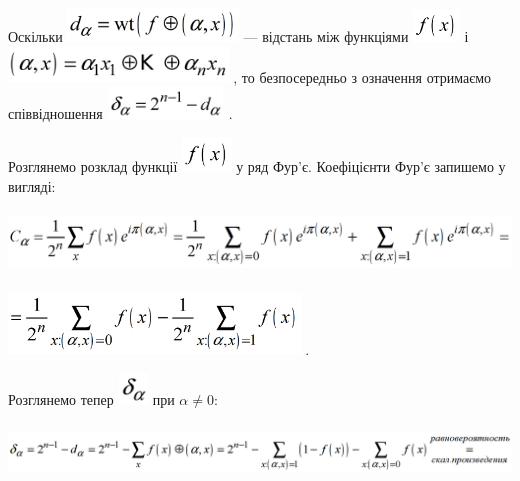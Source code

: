 Оскільки 
\includegraphics[width=1.7874in,height=0.3547in]{crypt-img/crypt-img278.png}  ---
відстань між функціями 
\includegraphics[width=0.4862in,height=0.3366in]{crypt-img/crypt-img279.png}  і
 \includegraphics[width=2.2984in,height=0.3764in]{crypt-img/crypt-img280.png} ,
то безпосередньо з означення отримаємо співвідношення 
\includegraphics[width=1.2154in,height=0.3346in]{crypt-img/crypt-img281.png} . 

\textcolor[rgb]{0.0,0.5019608,0.0}{Розглянемо} розклад функції 
\includegraphics[width=0.5165in,height=0.3583in]{crypt-img/crypt-img282.png}  у
ряд Фур’є. Коефіцієнти Фур’є запишемо у вигляді:

{\centering 
\includegraphics[width=6.3945in,height=0.6598in]{crypt-img/crypt-img283.png}
\par}

 \includegraphics[width=3.0472in,height=0.6417in]{crypt-img/crypt-img284.png} .

\textcolor[rgb]{0.0,0.5019608,0.0}{Розглянемо} тепер 
\includegraphics[width=0.3091in,height=0.3382in]{crypt-img/crypt-img285.png} 
при  ${\alpha \neq 0}$:

{\centering 
\includegraphics[width=6.8465in,height=0.5835in]{crypt-img/crypt-img286.png}
\par}

